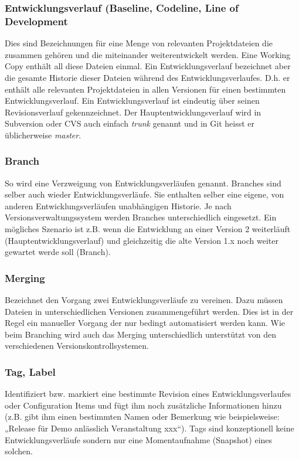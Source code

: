 \documentclass[10pt]{article}
\begin{document}
\subsubsection{Entwicklungsverlauf (Baseline, Codeline, Line of Development}
Dies sind Bezeichnungen für eine Menge von relevanten Projektdateien die zusammen gehören und die miteinander weiterentwickelt werden. Eine Working Copy enthält all diese Dateien einmal. Ein Entwicklungsverlauf bezeichnet aber die gesamte Historie dieser Dateien während des Entwicklungsverlaufes. D.h. er enthält alle relevanten Projektdateien in allen Versionen für einen bestimmten Entwicklungsverlauf. Ein Entwicklungsverlauf ist eindeutig über seinen Revisionsverlauf gekennzeichnet. Der Hauptentwicklungsverlauf wird in Subversion oder CVS auch einfach \textit{trunk} genannt und in Git heisst er üblicherweise \textit{master}.

\subsubsection{Branch}
So wird eine Verzweigung von Entwicklungsverläufen genannt. Branches sind selber auch wieder Entwicklungsverläufe. Sie enthalten selber eine eigene, von anderen Entwicklungsverläufen unabhängigen Historie. Je nach Versionsverwaltungssystem werden Branches unterschiedlich eingesetzt. Ein mögliches Szenario ist z.B. wenn die Entwicklung an einer Version 2 weiterläuft (Hauptentwicklungsverlauf) und gleichzeitig die alte Version 1.x noch weiter gewartet werde soll (Branch). 

\subsubsection{Merging}
Bezeichnet den Vorgang zwei Entwicklungsverläufe zu vereinen. Dazu müssen Dateien in unterschiedlichen Versionen zusammengeführt werden. Dies ist in der Regel ein manueller Vorgang der nur bedingt automatisiert werden kann. Wie beim Branching wird auch das Merging unterschiedlich unterstützt von den verschiedenen Versionskontrollsystemen. 

\subsubsection{Tag, Label}
Identifiziert bzw. markiert eine bestimmte Revision eines Entwicklungsverlaufes oder Configuration Items und fügt ihm noch zusätzliche Informationen hinzu (z.B. gibt ihm einen bestimmten Namen oder Bemerkung wie beispielsweise: „Release für Demo anlässlich Veranstaltung xxx“). Tags sind konzeptionell keine Entwicklungsverläufe sondern nur eine Momentaufnahme (Snapshot) eines solchen.
\end{document}
